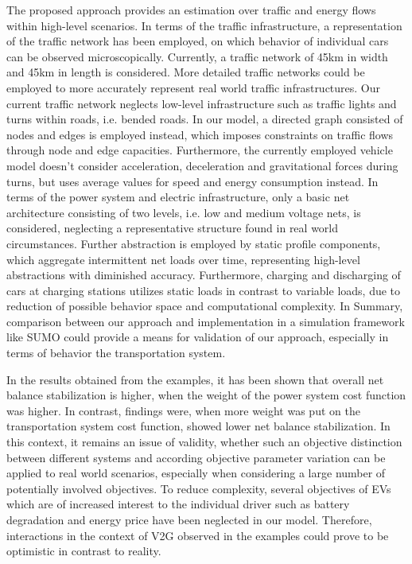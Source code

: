 The proposed approach provides an estimation over traffic and energy flows within high-level scenarios. In terms of the traffic infrastructure, a representation of the traffic network has been employed, on which behavior of individual cars can be observed microscopically. Currently, a traffic network of 45km in width and 45km in length is considered. More detailed traffic networks could be employed to more accurately represent real world traffic infrastructures. Our current traffic network neglects low-level infrastructure such as traffic lights and turns within roads, i.e. bended roads. In our model, a directed graph consisted of nodes and edges is employed instead, which imposes constraints on traffic flows through node and edge capacities. Furthermore, the currently employed vehicle model doesn't consider acceleration, deceleration and gravitational forces during turns, but uses average values for speed and energy consumption instead. In terms of the power system and electric infrastructure, only a basic net architecture consisting of two levels, i.e. low and medium voltage nets, is considered, neglecting a representative structure found in real world circumstances. Further abstraction is employed by static profile components, which aggregate intermittent net loads over time, representing high-level abstractions with diminished accuracy. Furthermore, charging and discharging of cars at charging stations utilizes static loads in contrast to variable loads, due to reduction of possible behavior space and computational complexity. In Summary, comparison between our approach and implementation in a simulation framework like SUMO could provide a means for validation of our approach, especially in terms of behavior the transportation system.

In the results obtained from the examples, it has been shown that overall net balance stabilization is higher, when the weight of the power system cost function was higher. In contrast, findings were, when more weight was put on the transportation system cost function, showed lower net balance stabilization. In this context, it remains an issue of validity, whether such an objective distinction between different systems and according objective parameter variation can be applied to real world scenarios, especially when considering a large number of potentially involved objectives. To reduce complexity, several objectives of EVs which are of increased interest to the individual driver such as battery degradation and energy price have been neglected in our model. Therefore, interactions in the context of V2G observed in the examples could prove to be optimistic in contrast to reality. 

